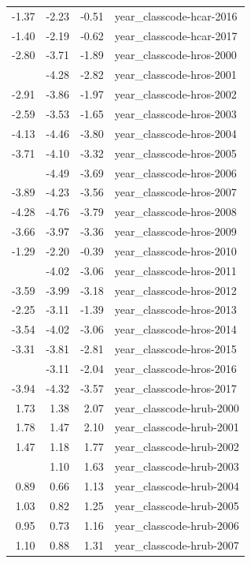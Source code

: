 \documentclass[]{article}
\begin{document}
\begin{longtable}[t]{rrrl}
-1.37 & -2.23 & -0.51 & year\_classcode-hcar-2016\\
-1.40 & -2.19 & -0.62 & year\_classcode-hcar-2017\\
-2.80 & -3.71 & -1.89 & year\_classcode-hros-2000\\
\addlinespace
-3.55 & -4.28 & -2.82 & year\_classcode-hros-2001\\
-2.91 & -3.86 & -1.97 & year\_classcode-hros-2002\\
-2.59 & -3.53 & -1.65 & year\_classcode-hros-2003\\
-4.13 & -4.46 & -3.80 & year\_classcode-hros-2004\\
-3.71 & -4.10 & -3.32 & year\_classcode-hros-2005\\
\addlinespace
-4.09 & -4.49 & -3.69 & year\_classcode-hros-2006\\
-3.89 & -4.23 & -3.56 & year\_classcode-hros-2007\\
-4.28 & -4.76 & -3.79 & year\_classcode-hros-2008\\
-3.66 & -3.97 & -3.36 & year\_classcode-hros-2009\\
-1.29 & -2.20 & -0.39 & year\_classcode-hros-2010\\
\addlinespace
-3.54 & -4.02 & -3.06 & year\_classcode-hros-2011\\
-3.59 & -3.99 & -3.18 & year\_classcode-hros-2012\\
-2.25 & -3.11 & -1.39 & year\_classcode-hros-2013\\
-3.54 & -4.02 & -3.06 & year\_classcode-hros-2014\\
-3.31 & -3.81 & -2.81 & year\_classcode-hros-2015\\
\addlinespace
-2.57 & -3.11 & -2.04 & year\_classcode-hros-2016\\
-3.94 & -4.32 & -3.57 & year\_classcode-hros-2017\\
1.73 & 1.38 & 2.07 & year\_classcode-hrub-2000\\
1.78 & 1.47 & 2.10 & year\_classcode-hrub-2001\\
1.47 & 1.18 & 1.77 & year\_classcode-hrub-2002\\
\addlinespace
1.37 & 1.10 & 1.63 & year\_classcode-hrub-2003\\
0.89 & 0.66 & 1.13 & year\_classcode-hrub-2004\\
1.03 & 0.82 & 1.25 & year\_classcode-hrub-2005\\
0.95 & 0.73 & 1.16 & year\_classcode-hrub-2006\\
1.10 & 0.88 & 1.31 & year\_classcode-hrub-2007\\

\end{longtable}
\end{document}

